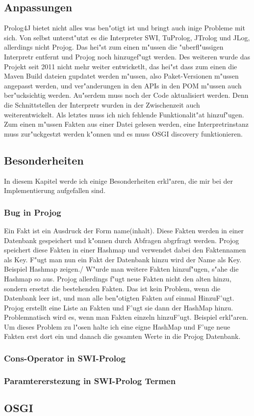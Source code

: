 \subsection{Anpassungen}
Prolog4J bietet nicht alles was ben"otigt ist und bringt auch inige Probleme mit sich. Von selbst unterst"utzt es die Interpreter SWI, TuProlog, JTrolog und JLog, allerdings nicht Projog. Das hei"st zum einen m"ussen die "uberfl"ussigen Interpretr entfernt und Projog noch hinzugef"ugt werden. Des weiteren wurde das Projekt seit 2011 nicht mehr weiter entwicketlt, das hei"st dass zum einen die Maven Build dateien gupdatet werden m"ussen, also Paket-Versionen m"ussen angepasst werden, und ver"anderungen in den APIs in den POM m"ussen auch ber"ucksichtig werden. Au"serdem muss noch der Code aktualisiert werden. Denn die Schnittstellen der Interpretr wurden in der Zwischenzeit auch weiterentwickelt. Als letztes muss ich nich fehlende Funktionalit"at hinzuf"ugen. Zum einen m"ussen Fakten aus einer Datei gelesen werden, eine Interpretrinstanz muss zur"uckgestzt werden k"onnen und es muss OSGI discovery funktionieren.

\subsection{Besonderheiten}
In diesem Kapitel werde ich einige Besonderheiten erkl"aren, die mir bei der Implementierung aufgefallen sind.

\subsubsection{Bug in Projog}
Ein Fakt ist ein Ausdruck der Form name(inhalt). Diese Fakten werden in einer Datenbank gespeichert und k"onnen durch Abfragen abgrfragt werden. Projog speichert diese Fakten in einer Hashmap und verwendet dabei den Faktennamen als Key. F"ugt man nun ein Fakt der Datenbank hinzu wird der Name als Key. Beispiel Hashmap zeigen./ W"urde man weitere Fakten hinzuf"ugen, s"ahe die Hashmap so aus. Projog allerdings f"ugt neue Fakten nicht den alten hinzu, sondern ersetzt die bestehenden Fakten. Das ist kein Problem, wenn die Datenbank leer ist, und man alle ben"otigten Fakten auf einmal HinzuF'ugt. Projog erstellt eine Liste an Fakten und F'ugt sie dann der HashMap hinzu. Problemnatisch wird es, wenn man Fakten einzeln hinzuF'ugt. Beispiel erkl"aren. Um dieses Problem zu l"osen halte ich eine eigne HashMap und F'uge neue Fakten erst dort ein und danach die gesamten Werte in die Projog Datenbank.
\subsubsection{Cons-Operator in SWI-Prolog}

\subsubsection{Paramtererstezung in SWI-Prolog Termen}


\subsection{OSGI}














